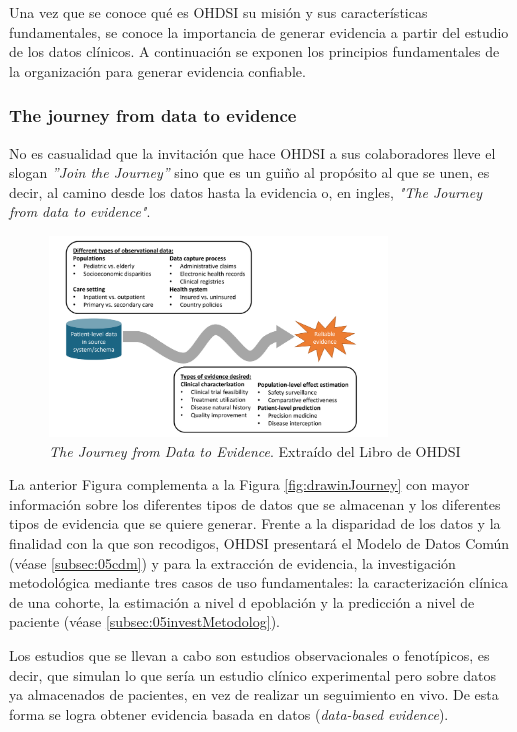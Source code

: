 Una vez que se conoce qué es OHDSI su misión y sus características fundamentales, se conoce la importancia de generar evidencia a partir del estudio de los datos clínicos. A continuación se exponen los principios fundamentales de la organización para generar evidencia confiable.

\subsubsection{The journey from data to evidence}

No es casualidad que la invitación que hace OHDSI a sus colaboradores lleve el slogan \textit{''Join the Journey''} sino que es un guiño al propósito al que se unen, es decir, al camino desde los datos hasta la evidencia o, en ingles, \textit{"The Journey from data to evidence"}.

\begin{figure}[H]
    \centering
    \includegraphics[width=0.80\textwidth]{figures/journeyDataToEvidence.png}
     \caption{\textit{The Journey from Data to Evidence}. Extraído del Libro de OHDSI \cite{OHDSIbook}}
    \label{fig:journeyDataToEvidence}
\end{figure}

La anterior Figura complementa a la Figura \ref{fig:drawinJourney} con mayor información sobre los diferentes tipos de datos que se almacenan y los diferentes tipos de evidencia que se quiere generar. Frente a la disparidad de los datos y la finalidad con la que son recodigos, OHDSI presentará el Modelo de Datos Común (véase \ref{subsec:05cdm}) y para la extracción de evidencia, la investigación metodológica mediante tres casos de uso fundamentales: la caracterización clínica de una cohorte, la estimación a nivel d epoblación y la predicción a nivel de paciente (véase \ref{subsec:05investMetodolog}).

Los estudios que se llevan a cabo son estudios observacionales o fenotípicos, es decir, que simulan lo que sería un estudio clínico experimental pero sobre datos ya almacenados de pacientes, en vez de realizar un seguimiento en vivo. De esta forma se logra obtener evidencia basada en datos (\textit{data-based evidence}).

